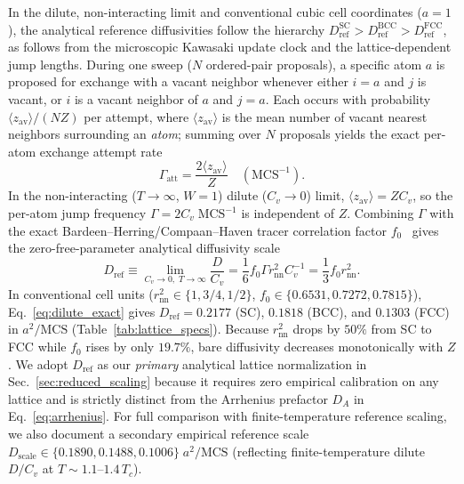 \documentclass[aps,pre,reprint,superscriptaddress,amsmath,amssymb,floatfix]{revtex4-2}
\begin{document}
In the dilute, non-interacting limit and conventional cubic cell coordinates ($a = 1$), the analytical reference diffusivities follow the hierarchy $D_{\mathrm{ref}}^{\mathrm{SC}} > D_{\mathrm{ref}}^{\mathrm{BCC}} > D_{\mathrm{ref}}^{\mathrm{FCC}}$, as follows from the microscopic Kawasaki update clock and the lattice-dependent jump lengths. During one sweep ($N$ ordered-pair proposals), a specific atom $a$ is proposed for exchange with a vacant neighbor whenever either $i = a$ and $j$ is vacant, or $i$ is a vacant neighbor of $a$ and $j = a$. Each occurs with probability $\langle z_{\mathrm{av}} \rangle/(NZ)$ per attempt, where $\langle z_{\mathrm{av}} \rangle$ is the mean number of vacant nearest neighbors surrounding an \emph{atom}; summing over $N$ proposals yields the exact per-atom exchange attempt rate
\begin{equation}
  \Gamma_{\mathrm{att}} = \frac{2\langle z_{\mathrm{av}} \rangle}{Z} \quad (\mathrm{MCS}^{-1}).
  \label{eq:attempt_rate}
\end{equation}
In the non-interacting ($T \to \infty$, $W = 1$) dilute ($C_v \to 0$) limit, $\langle z_{\mathrm{av}} \rangle = Z C_v$, so the per-atom jump frequency $\Gamma = 2 C_v\;\mathrm{MCS}^{-1}$ is independent of $Z$. Combining $\Gamma$ with the exact Bardeen--Herring/Compaan--Haven tracer correlation factor $f_0$~\cite{Bardeen1952,Compaan1956} gives the zero-free-parameter analytical diffusivity scale
\begin{equation}
  D_{\mathrm{ref}} \equiv \lim_{C_v \to 0,\; T \to \infty} \frac{D}{C_v} = \frac{1}{6} f_0 \Gamma r_{\mathrm{nn}}^2 C_v^{-1} = \frac{1}{3} f_0 r_{\mathrm{nn}}^2.
  \label{eq:dilute_exact}
\end{equation}
In conventional cell units ($r_{\mathrm{nn}}^2 \in \{1, 3/4, 1/2\}$, $f_0 \in \{0.6531, 0.7272, 0.7815\}$), Eq.~\eqref{eq:dilute_exact} gives $D_{\mathrm{ref}} = 0.2177$ (SC), $0.1818$ (BCC), and $0.1303$ (FCC) in $a^2/\mathrm{MCS}$ (Table~\ref{tab:lattice_specs}). Because $r_{\mathrm{nn}}^2$ drops by $50\%$ from SC to FCC while $f_0$ rises by only $19.7\%$, bare diffusivity decreases monotonically with $Z$. We adopt $D_{\mathrm{ref}}$ as our \emph{primary} analytical lattice normalization in Sec.~\ref{sec:reduced_scaling} because it requires zero empirical calibration on any lattice and is strictly distinct from the Arrhenius prefactor $D_A$ in Eq.~\eqref{eq:arrhenius}. For full comparison with finite-temperature reference scaling, we also document a secondary empirical reference scale $D_{\mathrm{scale}} \in \{0.1890, 0.1488, 0.1006\}\;a^2/\mathrm{MCS}$ (reflecting finite-temperature dilute $D/C_v$ at $T \sim 1.1$--$1.4\,T_c$).
\end{document}
